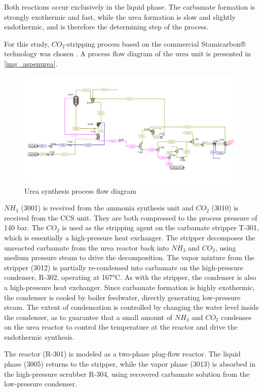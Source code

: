\documentclass[a4paper, titlepage]{article}
\begin{document}
Both reactions occur exclusively in the liquid phase. The carbamate formation is strongly exothermic and fast, while 
the urea formation is slow and slightly endothermic, and is therefore the determining step of the process.

For this study, $CO_2$-stripping process based on the commercial Stamicarbon® technology was chosen 
\cite{meessenUreaSynthesis2014}. A process flow diagram of the urea unit is presented in \autoref{img_aspenurea}.

\begin{figure}
	\includegraphics[width=\textwidth]{img/aspen_urea.png}
	\caption{Urea synthesis process flow diagram}
	\label{img_aspenurea}
\end{figure}

$NH_3$ (3001) is received from the ammonia synthesis unit and $CO_2$ (3010) is received from the CCS unit. They are 
both compressed to the process pressure of 140 bar. The $CO_2$ is used as the stripping agent on the carbamate 
stripper T-301, which is essentially a high-pressure heat exchanger. The stripper decomposes the unreacted carbamate 
from the urea reactor back into $NH_3$ and $CO_2$, using medium pressure steam to drive the decomposition. The vapor 
mixture from the stripper (3012) is partially re-condensed into carbamate on the high-pressure condenser, R-302, 
operating at 167°C. As with the stripper, the condenser is also a high-pressure heat exchanger. Since carbamate 
formation is highly exothermic, the condenser is cooled by boiler feedwater, directly generating low-pressure steam.
The extent of condensation is controlled by changing the water level inside the condenser, as to guarantee that a 
small amount of $NH_3$ and $CO_2$ condenses on the urea reactor to control the temperature at the reactor and 
drive the endothermic synthesis.

The reactor (R-301) is modeled as a two-phase plug-flow reactor. The liquid phase (3005) returns to the stripper, 
while the vapor phase (3013) is absorbed in the high-pressure scrubber R-304, using recovered carbamate solution from 
the low-pressure condenser.
\end{document}
